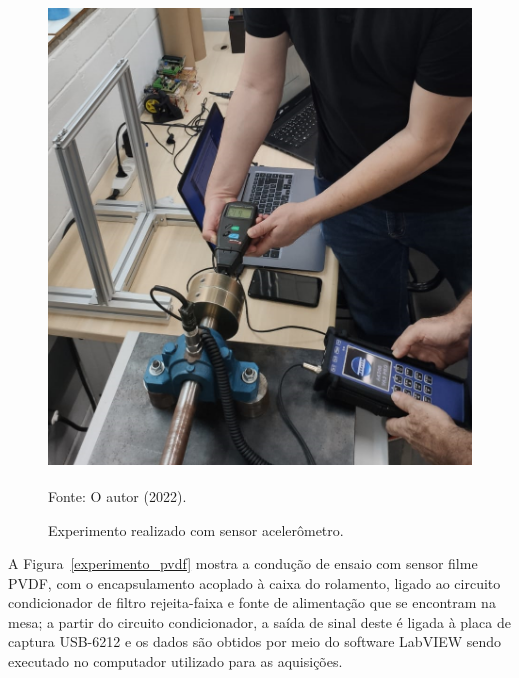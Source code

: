 \documentclass[
	12pt,				
	oneside,			
	a4paper,			
	english,			
	brazil,	
	sumario=abnt-6027-2012		
	]{abntex2ppgsi}
\begin{document}
\begin{figure}[H]
\centering
\caption {Experimento realizado com sensor acelerômetro.}
\includegraphics[width=\textwidth,height=130mm,keepaspectratio]{experimento_acelerometro} \\
Fonte: O autor (2022).
\label{experimento_acelerometro}
\end{figure}

A Figura~\ref{experimento_pvdf} mostra a condução de ensaio com sensor filme PVDF, com o encapsulamento acoplado à caixa do rolamento, ligado ao circuito condicionador de filtro rejeita-faixa e fonte de alimentação que se encontram na mesa; a partir do circuito condicionador, a saída de sinal deste é ligada à placa de captura USB-6212 e os dados são obtidos por meio do software LabVIEW sendo executado no computador utilizado para as aquisições. 
\end{document}
